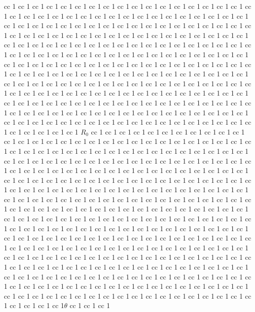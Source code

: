\documentclass[11pt]{article}
\begin{document}
\begin{itemize}
cc 1  cc 1  cc 1  cc 1  cc 1  cc 1  cc 1  cc 1  cc 1  cc 1  cc 1  cc 1  cc 1  cc 1  cc 1  cc 1  cc 1  cc 1  cc 1  cc 1  cc 1  cc 1  cc 1  cc 1  cc 1  cc 1  cc 1  cc 1  cc 1  cc 1  cc 1  cc 1  cc 1  cc 1  cc 1  cc 1  cc 1  cc 1  cc 1  cc 1  cc 1  cc 1  cc 1  cc 1  cc 1  cc 1  cc 1  cc 1  cc 1  cc 1  cc 1  cc 1  cc 1  cc 1  cc 1  cc 1  cc 1  cc 1  cc 1  cc 1  cc 1  cc 1  cc 1  cc 1  cc 1  cc 1  cc 1  cc 1  cc 1  cc 1  cc 1  cc 1  cc 1  cc 1  cc 1  cc 1  cc 1  cc 1  cc 1  cc 1  cc 1  cc 1  cc 1  cc 1  cc 1  cc 1  cc 1  cc 1  cc 1  cc 1  cc 1  cc 1  cc 1  cc 1  cc 1  cc 1  cc 1  cc 1  cc 1  cc 1  cc 1  cc 1  cc 1  cc 1  cc 1  cc 1  cc 1  cc 1  cc 1  cc 1  cc 1  cc 1  cc 1  cc 1  cc 1  cc 1  cc 1  cc 1  cc 1  cc 1  cc 1  cc 1  cc 1  cc 1  cc 1  cc 1  cc 1  cc 1  cc 1  cc 1  cc 1  cc 1  cc 1  cc 1  cc 1  cc 1  cc 1  cc 1  cc 1  cc 1  cc 1  cc 1  cc 1  cc 1  cc 1  cc 1  cc 1  cc 1  cc 1  cc 1  cc 1  cc 1  cc 1  cc 1  cc 1  cc 1  cc 1  cc 1  cc 1  cc 1  cc 1  cc 1  cc 1  cc 1  cc 1  cc 1  cc 1  cc 1  cc 1  cc 1  cc 1  cc 1  cc 1  cc 1  cc 1  cc 1  cc 1  cc 1  cc 1  cc 1  cc 1  cc 1  cc 1  cc 1  cc 1  cc 1  cc 1  cc 1  cc 1  cc 1  cc 1  cc 1  cc 1  cc 1  cc 1  cc 1  cc 1  cc 1  cc 1  cc 1  cc 1  cc 1  cc 1  cc 1  cc 1  cc 1  cc 1  cc 1  cc 1  cc 1  cc 1  cc 1  cc 1  cc 1  cc 1  cc 1  cc 1  cc 1  cc 1  cc 1  cc 1  cc 1  cc 1  cc 1  cc 1  cc 1  cc 1  cc 1  cc 1  cc 1  cc 1  cc 1  cc 1
$R_0$ cc 1  cc 1  cc 1  cc 1  cc 1  cc 1  cc 1  cc 1  cc 1  cc 1  cc 1  cc 1  cc 1  cc 1  cc 1  cc 1  cc 1  cc 1  cc 1  cc 1  cc 1  cc 1  cc 1  cc 1  cc 1  cc 1  cc 1  cc 1  cc 1  cc 1  cc 1  cc 1  cc 1  cc 1  cc 1  cc 1  cc 1  cc 1  cc 1  cc 1  cc 1  cc 1  cc 1  cc 1  cc 1  cc 1  cc 1  cc 1  cc 1  cc 1  cc 1  cc 1  cc 1  cc 1  cc 1  cc 1  cc 1  cc 1  cc 1  cc 1  cc 1  cc 1  cc 1  cc 1  cc 1  cc 1  cc 1  cc 1  cc 1  cc 1  cc 1  cc 1  cc 1  cc 1  cc 1  cc 1  cc 1  cc 1  cc 1  cc 1  cc 1  cc 1  cc 1  cc 1  cc 1  cc 1  cc 1  cc 1  cc 1  cc 1  cc 1  cc 1  cc 1  cc 1  cc 1  cc 1  cc 1  cc 1  cc 1  cc 1  cc 1  cc 1  cc 1  cc 1  cc 1  cc 1  cc 1  cc 1  cc 1  cc 1  cc 1  cc 1  cc 1  cc 1  cc 1  cc 1  cc 1  cc 1  cc 1  cc 1  cc 1  cc 1  cc 1  cc 1  cc 1  cc 1  cc 1  cc 1  cc 1  cc 1  cc 1  cc 1  cc 1  cc 1  cc 1  cc 1  cc 1  cc 1  cc 1  cc 1  cc 1  cc 1  cc 1  cc 1  cc 1  cc 1  cc 1  cc 1  cc 1  cc 1  cc 1  cc 1  cc 1  cc 1  cc 1  cc 1  cc 1  cc 1  cc 1  cc 1  cc 1  cc 1  cc 1  cc 1  cc 1  cc 1  cc 1  cc 1  cc 1  cc 1  cc 1  cc 1  cc 1  cc 1  cc 1  cc 1  cc 1  cc 1  cc 1  cc 1  cc 1  cc 1  cc 1  cc 1  cc 1  cc 1  cc 1  cc 1  cc 1  cc 1  cc 1  cc 1  cc 1  cc 1  cc 1  cc 1  cc 1  cc 1  cc 1  cc 1  cc 1  cc 1  cc 1  cc 1  cc 1  cc 1  cc 1  cc 1  cc 1  cc 1  cc 1  cc 1  cc 1  cc 1  cc 1  cc 1  cc 1  cc 1  cc 1  cc 1  cc 1  cc 1  cc 1  cc 1  cc 1  cc 1  cc 1  cc 1  cc 1  cc 1  cc 1  cc 1  cc 1  cc 1  cc 1  cc 1  cc 1  cc 1  cc 1  cc 1  cc 1  cc 1  cc 1  cc 1  cc 1  cc 1  cc 1  cc 1  cc 1  cc 1  cc 1  cc 1  cc 1  cc 1  cc 1  cc 1  cc 1  cc 1  cc 1  cc 1  cc 1  cc 1  cc 1  cc 1  cc 1  cc 1  cc 1  cc 1  cc 1  cc 1  cc 1  cc 1  cc 1  cc 1  cc 1  cc 1  cc 1  cc 1  cc 1  cc 1  cc 1  cc 1  cc 1  cc 1  cc 1  cc 1  cc 1  cc 1  cc 1  cc 1  cc 1  cc 1  cc 1  cc 1  cc 1  cc 1  cc 1  cc 1  cc 1  cc 1  cc 1  cc 1  cc 1  cc 1  cc 1  cc 1  cc 1  cc 1  cc 1  cc 1  cc 1  cc 1  cc 1$\theta$ cc 1  cc 1  cc 1

\end{itemize}
\end{document}
